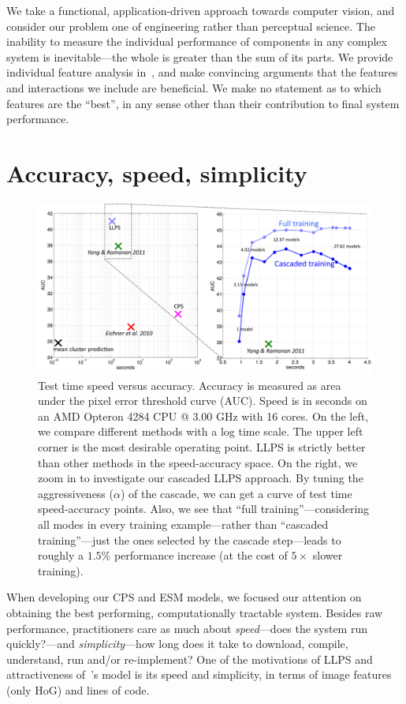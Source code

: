 We take a functional, application-driven approach towards computer vision, and 
consider our problem one of engineering rather than perceptual science.  The 
inability to measure the individual performance of components in any complex 
system is inevitable---the whole is greater than the sum of its parts.  We 
provide individual feature analysis in~, and make convincing 
arguments that the features and interactions we include are beneficial.  We 
make no statement as to which features are the ``best'', in any sense other 
than their contribution to final system performance.

\section{Accuracy, speed, simplicity}
\begin{figure}[htb!]
\centering
\includegraphics[width=0.95\linewidth]{figs/speed-vs-acc.pdf}
\caption[Speed versus accuracy.]{
\label{fig:speed-v-acc} Test time speed versus accuracy.  Accuracy is measured 
as area under the pixel error threshold curve (AUC).  Speed is in seconds on an 
AMD Opteron 4284 CPU @ 3.00 GHz with 16 cores.  On the left, we compare 
different methods with a log time scale.  The upper left corner is the most 
desirable operating point.  LLPS is strictly better than other methods in the 
speed-accuracy space.  On the right, we zoom in to investigate our cascaded 
LLPS approach.  By tuning the aggressiveness ($\alpha$) of the cascade, we can 
get a curve of test time speed-accuracy points.  Also, we see that ``full 
training''---considering all modes in every training example---rather than
``cascaded training''---just the ones selected by the cascade step---leads to 
roughly a $1.5\%$ performance increase (at the cost of $5\times$ slower 
training).}
\end{figure}

When developing our CPS and ESM models, we focused our attention on obtaining 
the best performing, computationally tractable system.  Besides raw 
performance, practitioners care as much about {\em speed}---does the system run 
quickly?---and {\em simplicity}---how long does it take to download, compile, 
understand, run and/or re-implement?  One of the motivations of LLPS and 
attractiveness of~\citet{deva2011}'s model is its speed and simplicity, in 
terms of image features (only HoG) and lines of code.

